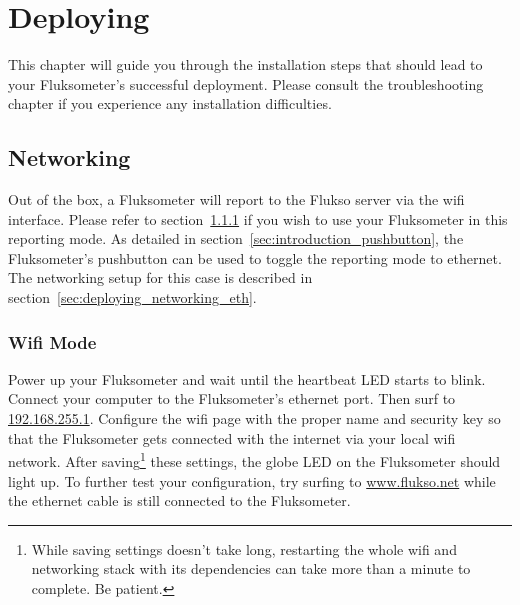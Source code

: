 \chapter{Deploying}

This chapter will guide you through the installation steps that should lead to your Fluksometer's successful deployment. Please consult the troubleshooting chapter if you experience any installation difficulties.


\section{Networking}
\label{sec:deploying_networking}

Out of the box, a Fluksometer will report to the Flukso server via the wifi interface. Please refer to section~\ref{sec:deploying_networking_wifi} if you wish to use your Fluksometer in this reporting mode. As detailed in section~\ref{sec:introduction_pushbutton}, the Fluksometer's pushbutton can be used to toggle the reporting mode to ethernet. The networking setup for this case is described in section~\ref{sec:deploying_networking_eth}.

\subsection{Wifi Mode}
\label{sec:deploying_networking_wifi}
Power up your Fluksometer and wait until the heartbeat LED starts to blink. Connect your computer to the Fluksometer's ethernet port. Then surf to \href{http://192.168.255.1}{192.168.255.1}. Configure the wifi page with the proper name and security key so that the Fluksometer gets connected with the internet via your local wifi network. After saving\footnote{While saving settings doesn't take long, restarting the whole wifi and networking stack with its dependencies can take more than a minute to complete. Be patient.} these settings, the globe LED on the Fluksometer should light up. To further test your configuration, try surfing to \href{http://www.flukso.net}{www.flukso.net} while the ethernet cable is still connected to the Fluksometer.


